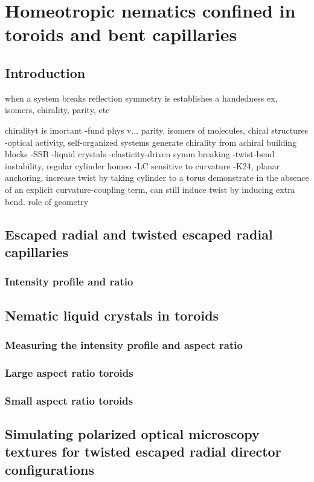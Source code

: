 \chapter{Homeotropic nematics confined in toroids and bent capillaries}

\section{Introduction}

when a system breaks reflection symmetry is establishes a handedness
ex, isomers, chirality, parity, etc

chiralityt is imortant
  -fund phys v... parity, isomers of molecules, chiral structures
  -optical activity, self-organized systems
generate chirality from achiral building blocks
  -SSB
  -liquid crystals
  -elasticity-driven symm breaking
    -twist-bend instability, regular cylinder homeo
  -LC sensitive to curvature
    -K24, planar anchoring, increase twist by taking cylinder to a torus
demonstrate in the absence of an explicit curvature-coupling term, can still induce twist by inducing extra bend.
role of geometry

\section{Escaped radial and twisted escaped radial capillaries}
\subsection{Intensity profile and ratio}


\section{Nematic liquid crystals in toroids}
\subsection{Measuring the intensity profile and aspect ratio}
\subsection{Large aspect ratio toroids}
\subsection{Small aspect ratio toroids}

\section{Simulating polarized optical microscopy textures for twisted escaped radial director configurations}
